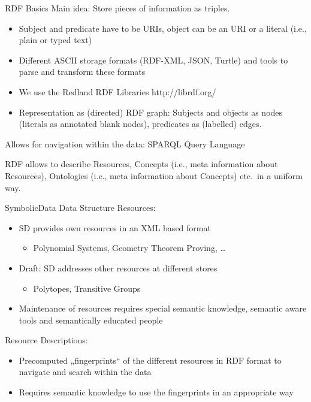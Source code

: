 \documentclass{beamer}
\begin{document}
\begin{frame}{RDF Basics}{}
Main idea: Store pieces of information as triples.
\begin{itemize}
\item Subject and predicate have to be URIs, object can be an URI or a literal
  (i.e., plain or typed text)
\item Different ASCII storage formats (RDF-XML, JSON, Turtle) and tools to
  parse and transform these formats
\item We use the Redland RDF Libraries http://librdf.org/
\item Representation as (directed) RDF graph: Subjects and objects as nodes
  (literals as annotated blank nodes), predicates as (labelled) edges.
\end{itemize}
Allows for navigation within the data: SPARQL Query Language

RDF allows to describe Resources, Concepts (i.e., meta information about
Resources), Ontologies (i.e., meta information about Concepts) etc.\ in a
uniform way.
\end{frame}

\begin{frame}{SymbolicData Data Structure}{}
Resources:
\begin{itemize}
\item SD provides own resources in an XML based format
\begin{itemize}
\item Polynomial Systems, Geometry Theorem Proving, \ldots
\end{itemize}
\item Draft: SD addresses other resources at different stores
\begin{itemize}
\item Polytopes, Transitive Groups
\end{itemize}
\item Maintenance of resources requires special semantic knowledge, semantic
  aware tools and semantically educated people
\end{itemize}
Resource Descriptions: 
\begin{itemize}
\item Precomputed „fingerprints“ of the different resources in RDF format to
  navigate and search within the data
\item Requires semantic knowledge to use the fingerprints in an appropriate
  way
\end{itemize}
\end{frame}
\end{document}

